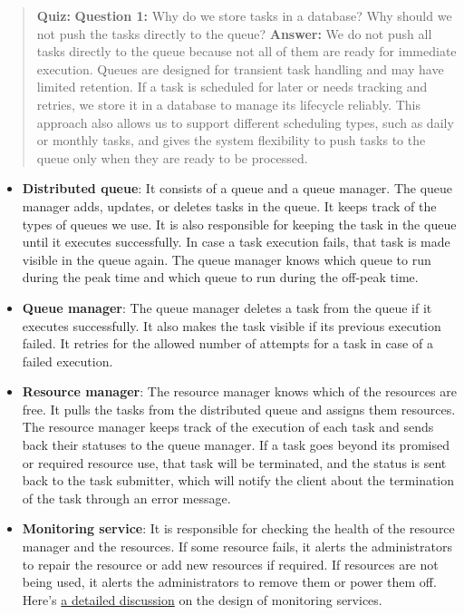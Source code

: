 \begin{quote}
\textbf{Quiz:}
\textbf{Question 1:} Why do we store tasks in a database? Why should we not push the tasks directly to the queue?
\textbf{Answer:} We do not push all tasks directly to the queue because not all of them are ready for immediate execution. Queues are designed for transient task handling and may have limited retention. If a task is scheduled for later or needs tracking and retries, we store it in a database to manage its lifecycle reliably. This approach also allows us to support different scheduling types, such as daily or monthly tasks, and gives the system flexibility to push tasks to the queue only when they are ready to be processed.
\end{quote}

\begin{itemize}
\item
\protect{}\label{5V1UmVfLbENKZpMwKF_jY}
\textbf{Distributed queue}: It consists of a queue and a queue manager. The queue manager adds, updates, or deletes tasks in the queue. It keeps track of the types of queues we use. It is also responsible for keeping the task in the queue until it executes successfully. In case a task execution fails, that task is made visible in the queue again. The queue manager knows which queue to run during the peak time and which queue to run during the off-peak time.
\item
\protect{}\label{VLiOOZeZbCcvgk4C5aB4j}
\textbf{Queue manager}: The queue manager deletes a task from the queue if it executes successfully. It also makes the task visible if its previous execution failed. It retries for the allowed number of attempts for a task in case of a failed execution.
\item
\protect{}\label{aZnctSbch00aKtFjsQrAg}
\textbf{Resource manager}: The resource manager knows which of the resources are free. It pulls the tasks from the distributed queue and assigns them resources. The resource manager keeps track of the execution of each task and sends back their statuses to the queue manager. If a task goes beyond its promised or required resource use, that task will be terminated, and the status is sent back to the task submitter, which will notify the client about the termination of the task through an error message.
\item
\protect{}\label{OOqDvXoTphBEYBbKPbTLY}
\textbf{Monitoring service}: It is responsible for checking the health of the resource manager and the resources. If some resource fails, it alerts the administrators to repair the resource or add new resources if required. If resources are not being used, it alerts the administrators to remove them or power them off. Here's \href{https://www.educative.io/courses/grokking-the-system-design-interview/system-design-distributed-monitoring}{a detailed discussion} on the design of monitoring services.
\end{itemize}

